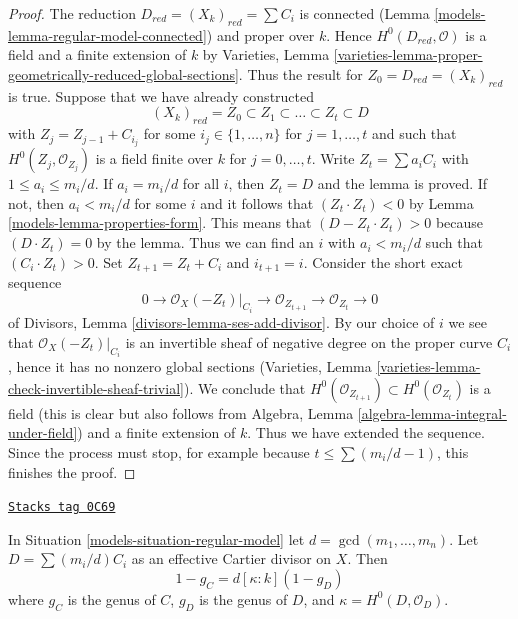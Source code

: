 \begin{proof}

The reduction $D_{red} = (X_k)_{red} = \sum C_i$ is connected
(Lemma \ref{models-lemma-regular-model-connected}) and proper over $k$. Hence
$H^0(D_{red}, \mathcal{O})$ is a field and a finite extension of
$k$ by Varieties, Lemma
\ref{varieties-lemma-proper-geometrically-reduced-global-sections}.
Thus the result for $Z_0 = D_{red} = (X_k)_{red}$ is true.
Suppose that we have already constructed
$$
(X_k)_{red} = Z_0 \subset Z_1 \subset \ldots \subset Z_t \subset D
$$
with $Z_j = Z_{j - 1} + C_{i_j}$ for some $i_j \in \{1, \ldots, n\}$
for $j = 1, \ldots, t$ and such that $H^0(Z_j, \mathcal{O}_{Z_j})$
is a field finite over $k$ for $j = 0, \ldots, t$.
Write $Z_t = \sum a_i C_i$ with $1 \leq a_i \leq m_i/d$.
If $a_i = m_i/d$ for all $i$, then $Z_t = D$ and the lemma is proved.
If not, then $a_i < m_i/d$ for some $i$ and it follows that
$(Z_t \cdot Z_t) < 0$ by Lemma \ref{models-lemma-properties-form}. This means that
$(D - Z_t \cdot Z_t) > 0$ because $(D \cdot Z_t) = 0$ by the lemma.
Thus we can find an $i$ with $a_i < m_i/d$ such that
$(C_i \cdot Z_t) > 0$. Set $Z_{t + 1} = Z_t + C_i$ and $i_{t + 1} = i$.
Consider the short exact sequence
$$
0 \to \mathcal{O}_X(-Z_t)|_{C_i} \to \mathcal{O}_{Z_{t + 1}} \to
\mathcal{O}_{Z_t} \to 0
$$
of Divisors, Lemma \ref{divisors-lemma-ses-add-divisor}.
By our choice of $i$ we see that
$\mathcal{O}_X(-Z_t)|_{C_i}$ is an invertible sheaf of negative degree
on the proper curve $C_i$, hence it has no nonzero global sections
(Varieties, Lemma \ref{varieties-lemma-check-invertible-sheaf-trivial}).
We conclude that $H^0(\mathcal{O}_{Z_{t + 1}}) \subset H^0(\mathcal{O}_{Z_t})$
is a field (this is clear but also follows from
Algebra, Lemma \ref{algebra-lemma-integral-under-field})
and a finite extension of $k$. Thus we have extended the sequence.
Since the process must stop, for example because $t \leq \sum (m_i/d - 1)$,
this finishes the proof.
\end{proof}

\begin{lemma}
\label{models-lemma-regular-model-genus}
\href{https://stacks.math.columbia.edu/tag/0C69}{\texttt{Stacks tag 0C69}}

\begin{reference}
\cite[Lemma 2.6]{Artin-Winters}
\end{reference}
In Situation \ref{models-situation-regular-model} let $d = \gcd(m_1, \ldots, m_n)$.
Let $D = \sum (m_i/d) C_i$ as an effective Cartier divisor on $X$. Then
$$
1 - g_C = d [\kappa : k] (1 - g_D)
$$
where $g_C$ is the genus of $C$, $g_D$ is the genus of $D$, and
$\kappa = H^0(D, \mathcal{O}_D)$.
\end{lemma}

